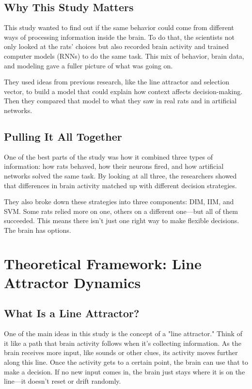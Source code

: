 \documentclass{article}
\begin{document}
\subsection{Why This Study Matters}
This study wanted to find out if the same behavior could come from different ways of processing information inside the brain. To do that, the scientists not only looked at the rats’ choices but also recorded brain activity and trained computer models (RNNs) to do the same task. This mix of behavior, brain data, and modeling gave a fuller picture of what was going on.

They used ideas from previous research, like the line attractor and selection vector, to build a model that could explain how context affects decision-making. Then they compared that model to what they saw in real rats and in artificial networks.

\subsection{Pulling It All Together}
One of the best parts of the study was how it combined three types of information: how rats behaved, how their neurons fired, and how artificial networks solved the same task. By looking at all three, the researchers showed that differences in brain activity matched up with different decision strategies.

They also broke down these strategies into three components: DIM, IIM, and SVM. Some rats relied more on one, others on a different one—but all of them succeeded. This means there isn't just one right way to make flexible decisions. The brain has options.


\section{Theoretical Framework: Line Attractor Dynamics}

\subsection{What Is a Line Attractor?}
One of the main ideas in this study is the concept of a "line attractor." Think of it like a path that brain activity follows when it's collecting information. As the brain receives more input, like sounds or other clues, its activity moves further along this line. Once the activity gets to a certain point, the brain can use that to make a decision. If no new input comes in, the brain just stays where it is on the line—it doesn’t reset or drift randomly.
\end{document}
